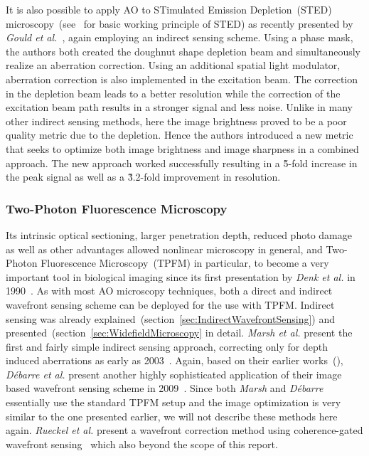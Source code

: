 It is also possible to apply AO to STimulated Emission Depletion~(STED) microscopy~(see~\cite{scan_STED_principle} for basic working principle of STED) as recently presented by \emph{Gould et al.}~\cite{scan_STED}, again employing an indirect sensing scheme. Using a phase mask, the authors both created the doughnut shape depletion beam and simultaneously realize an aberration correction. Using an additional spatial light modulator, aberration correction is also implemented in the  excitation beam. The correction in the depletion beam leads to a better resolution while the correction of the excitation beam path results in a stronger signal and less noise. Unlike in many other indirect sensing methods, here the image brightness proved to be a poor quality metric due to the depletion. Hence the authors  introduced a new metric that seeks to optimize both image brightness and image sharpness in a combined approach. The new approach worked successfully resulting in a \~5-fold increase in the peak signal as well as a \~3.2-fold improvement in resolution.

\subsubsection{Two-Photon Fluorescence Microscopy}
\label{sec:twoPhotonExcitation}

Its intrinsic optical sectioning, larger penetration depth, reduced photo damage as well as other advantages allowed nonlinear microscopy in general, and Two-Photon Fluorescence Microscopy~(TPFM) in particular, to become a very important tool in biological imaging since its first presentation by \emph{Denk et al.} in 1990~\cite{scan_TPFM_principle}. As with most AO microscopy techniques, both a direct and indirect wavefront sensing scheme can be deployed for the use with TPFM. Indirect sensing was already explained~(section~\ref{sec:IndirectWavefrontSensing}) and presented~(section~\ref{sec:WidefieldMicroscopy} in detail. \emph{Marsh et al.} present the first and fairly simple indirect sensing approach, correcting only for depth induced aberrations as early as 2003~\cite{scan_TPFM_pratical}. Again, based on their earlier works~(\cite{wide_AOM_loew_freq,wide_AOM_structured_illu}), \emph{D\'{e}barre et al.} present another highly sophisticated application of their image based wavefront sensing scheme in 2009~\cite{scan_TPFM_image_based}. Since both \emph{Marsh} and \emph{D\'{e}barre} essentially use the standard TPFM setup and the image optimization is very similar to the one presented earlier, we will not describe these methods here again. \emph{Rueckel et al.} present a wavefront correction method using coherence-gated wavefront sensing~\cite{scan_TPFM_gated_wavefront} which also beyond the scope of this report. 

